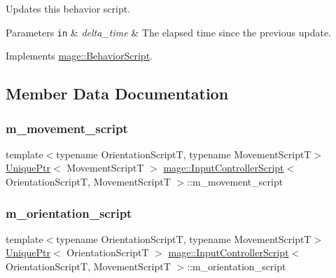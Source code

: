 Updates this behavior script.


\begin{DoxyParams}[1]{Parameters}
\mbox{\tt in}  & {\em delta\+\_\+time} & The elapsed time since the previous update. \\
\hline
\end{DoxyParams}


Implements \hyperlink{classmage_1_1_behavior_script_a905b6c83640cb91d19fecab3435f6feb}{mage\+::\+Behavior\+Script}.



\subsection{Member Data Documentation}
\hypertarget{classmage_1_1_input_controller_script_aea0478602dbabf616dd3ef8b4408a42a}{}\label{classmage_1_1_input_controller_script_aea0478602dbabf616dd3ef8b4408a42a} 
\subsubsection{\texorpdfstring{m\+\_\+movement\+\_\+script}{m\_movement\_script}}
{\footnotesize\ttfamily template$<$typename Orientation\+ScriptT, typename Movement\+ScriptT$>$ \\
\hyperlink{namespacemage_a3316d7143a973e37adf1110f2e80ca31}{Unique\+Ptr}$<$ Movement\+ScriptT $>$ \hyperlink{classmage_1_1_input_controller_script}{mage\+::\+Input\+Controller\+Script}$<$ Orientation\+ScriptT, Movement\+ScriptT $>$\+::m\+\_\+movement\+\_\+script\hspace{0.3cm}{\ttfamily [private]}}

\hypertarget{classmage_1_1_input_controller_script_ab5af05a3bf7cdd672382dd5bcb1d6d02}{}\label{classmage_1_1_input_controller_script_ab5af05a3bf7cdd672382dd5bcb1d6d02} 
\subsubsection{\texorpdfstring{m\+\_\+orientation\+\_\+script}{m\_orientation\_script}}
{\footnotesize\ttfamily template$<$typename Orientation\+ScriptT, typename Movement\+ScriptT$>$ \\
\hyperlink{namespacemage_a3316d7143a973e37adf1110f2e80ca31}{Unique\+Ptr}$<$ Orientation\+ScriptT $>$ \hyperlink{classmage_1_1_input_controller_script}{mage\+::\+Input\+Controller\+Script}$<$ Orientation\+ScriptT, Movement\+ScriptT $>$\+::m\+\_\+orientation\+\_\+script\hspace{0.3cm}{\ttfamily [private]}}

